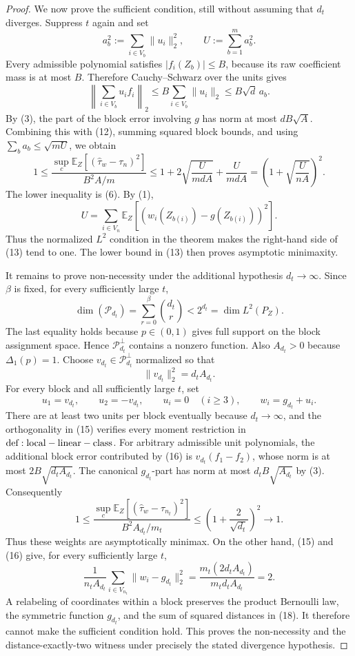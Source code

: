 \documentclass{article}
\begin{document}
\begin{proof}
We now prove the sufficient condition, still without assuming that \(d_t\) diverges. Suppress \(t\) again and set
\[
a_b^2:=\sum_{i\in V_b}\lVert u_i\rVert_2^2,
\qquad U:=\sum_{b=1}^m a_b^2.
\]
Every admissible polynomial satisfies \(|f_i(Z_b)|\le B\), because its raw coefficient mass is at most \(B\). Therefore Cauchy--Schwarz over the units gives
\[
\left\lVert\sum_{i\in V_b}u_if_i\right\rVert_2
\le B\sum_{i\in V_b}\lVert u_i\rVert_2
\le B\sqrt d\,a_b.
\tag{12}
\]
By (3), the part of the block error involving \(g\) has norm at most \(dB\sqrt A\). Combining this with (12), summing squared block bounds, and using \(\sum_ba_b\le\sqrt{mU}\), we obtain
\[
1\le
\frac{\sup_c\mathbb E_Z[(\widehat\tau_w-\tau_n)^2]}{B^2A/m}
\le1+2\sqrt{\frac{U}{mdA}}+\frac{U}{mdA}
=\left(1+\sqrt{\frac{U}{nA}}\right)^2.
\tag{13}
\]
The lower inequality is (6). By (1),
\[
U=\sum_{i\in V_n}\mathbb E_Z[(w_i(Z_{b(i)})-g(Z_{b(i)}))^2].
\]
Thus the normalized \(L^2\) condition in the theorem makes the right-hand side of (13) tend to one. The lower bound in (13) then proves asymptotic minimaxity.

It remains to prove non-necessity under the additional hypothesis \(d_t\to\infty\). Since \(\beta\) is fixed, for every sufficiently large \(t\),
\[
\dim(\mathcal P_{d_t})=\sum_{r=0}^{\beta}\binom{d_t}{r}<2^{d_t}=\dim L^2(P_Z).
\tag{14}
\]
The last equality holds because \(p\in(0,1)\) gives full support on the block assignment space. Hence \(\mathcal P_{d_t}^{\perp}\) contains a nonzero function. Also \(A_{d_t}>0\) because \(\Delta_1(p)=1\). Choose \(v_{d_t}\in\mathcal P_{d_t}^{\perp}\) normalized so that
\[
\lVert v_{d_t}\rVert_2^2=d_tA_{d_t}.
\tag{15}
\]
For every block and all sufficiently large \(t\), set
\[
u_1=v_{d_t},\qquad u_2=-v_{d_t},\qquad u_i=0\quad(i\ge3),
\qquad w_i=g_{d_t}+u_i.
\tag{16}
\]
There are at least two units per block eventually because \(d_t\to\infty\), and the orthogonality in (15) verifies every moment restriction in \({\rm def:local-linear-class}\). For arbitrary admissible unit polynomials, the additional block error contributed by (16) is \(v_{d_t}(f_1-f_2)\), whose norm is at most \(2B\sqrt{d_tA_{d_t}}\). The canonical \(g_{d_t}\)-part has norm at most \(d_tB\sqrt{A_{d_t}}\) by (3). Consequently
\[
1\le
\frac{\sup_c\mathbb E_Z[(\widehat\tau_w-\tau_{n_t})^2]}
{B^2A_{d_t}/m_t}
\le\left(1+\frac{2}{\sqrt{d_t}}\right)^2\longrightarrow1.
\tag{17}
\]
Thus these weights are asymptotically minimax. On the other hand, (15) and (16) give, for every sufficiently large \(t\),
\[
\frac{1}{n_tA_{d_t}}\sum_{i\in V_{n_t}}
\lVert w_i-g_{d_t}\rVert_2^2
=\frac{m_t(2d_tA_{d_t})}{m_td_tA_{d_t}}=2.
\tag{18}
\]
A relabeling of coordinates within a block preserves the product Bernoulli law, the symmetric function \(g_{d_t}\), and the sum of squared distances in (18). It therefore cannot make the sufficient condition hold. This proves the non-necessity and the distance-exactly-two witness under precisely the stated divergence hypothesis.
\end{proof}
\end{document}
